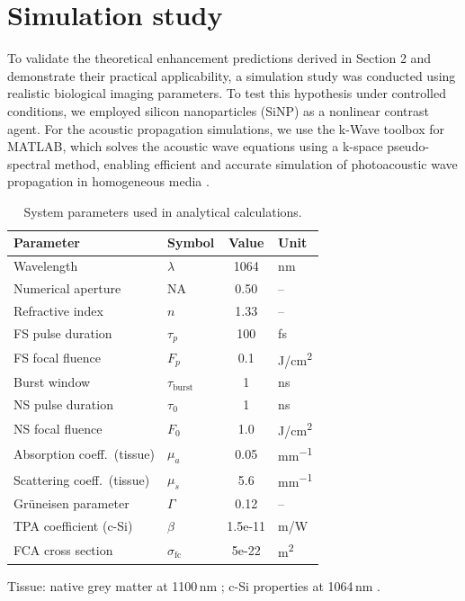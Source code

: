 \documentclass{optica-article}
\begin{document}
\section{Simulation study}

To validate the theoretical enhancement predictions derived in Section 2 and demonstrate their practical applicability, a simulation study was conducted using realistic biological imaging parameters. To test this hypothesis under controlled conditions, we employed silicon nanoparticles (SiNP) as a nonlinear contrast agent. For the acoustic propagation simulations, we use the k-Wave toolbox for MATLAB, which solves the acoustic wave equations using a k-space pseudo-spectral method, enabling efficient and accurate simulation of photoacoustic wave propagation in homogeneous media \cite{Treeby2010kWave}.

\begin{table}[htbp]
  \centering
  \caption{System parameters used in analytical calculations.}
  \label{tab:params}
  \small
  \begin{tabular}{@{}llS[table-format=1.2e2]l@{}}
  \toprule
  Parameter & Symbol & {Value} & Unit \\
  \midrule
  Wavelength              & $\lambda$       & 1064    & nm \\
  Numerical aperture      & NA              & 0.50    & -- \\
  Refractive index        & $n$             & 1.33    & -- \\
  FS pulse duration       & $\tau_p$        & 100     & fs \\
  FS focal fluence        & $F_p$           & 0.1     & \si{J/cm^2} \\
  Burst window            & $\tau_{\mathrm{burst}}$ & 1 & ns \\
  NS pulse duration       & $\tau_0$        & 1       & ns \\
  NS focal fluence        & $F_0$           & 1.0     & \si{J/cm^2} \\
  \midrule
  Absorption coeff.\ (tissue) & $\mu_a$     & 0.05    & \si{mm^{-1}} \\
  Scattering coeff.\ (tissue) & $\mu_s$     & 5.6     & \si{mm^{-1}} \\
  Gr\"uneisen parameter   & $\Gamma$        & 0.12    & -- \\
  \midrule
  TPA coefficient (c-Si)  & $\beta$         & 1.5e-11 & \si{m/W} \\
  FCA cross section       & $\sigma_{\mathrm{fc}}$ & 5e-22 & \si{m^2} \\
  \bottomrule
  \end{tabular}
  \par\vspace{2pt}
  {\footnotesize Tissue: native grey matter at 1100\,nm \cite{yaroslavsky2002}; c-Si properties at 1064\,nm \cite{boggess1986}.}
\end{table}
\end{document}
